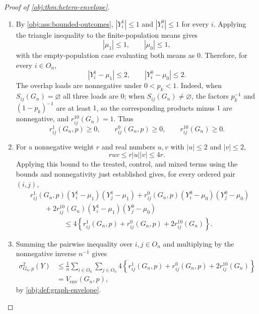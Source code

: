 \begin{proof}[Proof of \cref{obj:thm:hetero-envelope}]
\begin{enumerate}
\item By \cref{obj:ass:bounded-outcomes}, \(|Y_i^1|\le1\) and \(|Y_i^0|\le1\) for every \(i\).  Applying the triangle inequality to the finite-population means gives
\[
|\mu_1|\le1,
\qquad
|\mu_0|\le1,
\]
with the empty-population case evaluating both means as \(0\).  Therefore, for every \(i\in O_n\),
\[
|Y_i^1-\mu_1|\le2,
\qquad
|Y_i^0-\mu_0|\le2.
\]
The overlap loads are nonnegative under \(0<p_k<1\).  Indeed, when \(S_{ij}(G_n)=\varnothing\) all three loads are \(0\); when \(S_{ij}(G_n)\neq\varnothing\), the factors \(p_k^{-1}\) and \((1-p_k)^{-1}\) are at least \(1\), so the corresponding products minus \(1\) are nonnegative, and \(r_{ij}^{10}(G_n)=1\).  Thus
\[
r_{ij}^1(G_n,p)\ge0,
\qquad
r_{ij}^0(G_n,p)\ge0,
\qquad
r_{ij}^{10}(G_n)\ge0.
\]

\item For a nonnegative weight \(r\) and real numbers \(u,v\) with \(|u|\le2\) and \(|v|\le2\),
\[
ruv\le r|u||v|\le4r.
\]
Applying this bound to the treated, control, and mixed terms using the bounds and nonnegativity just established gives, for every ordered pair \((i,j)\),
\[
\begin{aligned}
& r_{ij}^1(G_n,p)(Y_i^1-\mu_1)(Y_j^1-\mu_1)
+r_{ij}^0(G_n,p)(Y_i^0-\mu_0)(Y_j^0-\mu_0)\\
&\qquad{}+2r_{ij}^{10}(G_n)(Y_i^1-\mu_1)(Y_j^0-\mu_0)\\
&\hspace{2cm}\le
4\left\{
r_{ij}^1(G_n,p)+r_{ij}^0(G_n,p)+2r_{ij}^{10}(G_n)
\right\}.
\end{aligned}
\]

\item Summing the pairwise inequality over \(i,j\in O_n\) and multiplying by the nonnegative inverse \(n^{-1}\) gives
\[
\begin{aligned}
\sigma^2_{G_n,p}(Y)
&\le
\frac1n\sum_{i\in O_n}\sum_{j\in O_n}
4\left\{
r_{ij}^1(G_n,p)+r_{ij}^0(G_n,p)+2r_{ij}^{10}(G_n)
\right\}\\
&=V_{\mathrm{env}}(G_n,p),
\end{aligned}
\]
by \cref{obj:def:graph-envelope}.
\end{enumerate}
\end{proof}

